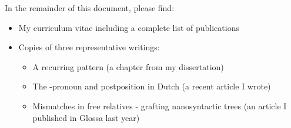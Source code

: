 \documentclass[12pt]{article}
\begin{document}
\newpage

In the remainder of this document, please find:

\begin{itemize}
  \item My curriculum vitae including a complete list of publications
  \item Copies of three representative writings:
  \begin{itemize}
    \item A recurring pattern (a chapter from my dissertation)
    \item The -pronoun and postposition  in Dutch (a recent article I wrote)
    \item Mismatches in free relatives - grafting nanosyntactic trees (an article I published in Glossa last year)
  \end{itemize}
\end{itemize}
\end{document}
